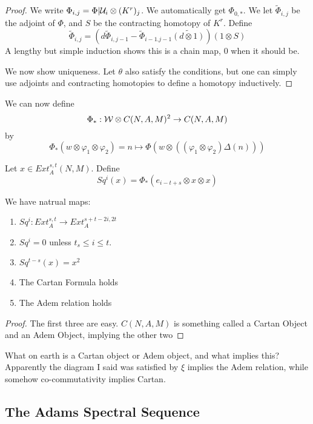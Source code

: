 \begin{proof}
  We write $\Phi_{i,j}=\Phi|\mathcal{U}_i\otimes (K^r)_j$.
  We automatically get $\Phi_{0,*}$.  
  We let $\tilde{\Phi}_{i,j}$ be the adjoint of $\Phi$, and $S$ be the contracting homotopy of $K^r$.  
  Define
  \[\tilde\Phi_{i,j}=(d\tilde\Phi_{i,j-1}-\tilde{\Phi}_{i-1.j-1}\widetilde{(d\otimes 1)})(1\otimes S)\]
  A lengthy but simple induction shows this is a chain map, 0 when it should be.  \cite[Page 98]{hrs}

  We now show uniqueness.  Let $\theta$ also satisfy the conditions, but one can simply use adjoints and contracting homotopies to define a homotopy inductively.  
\end{proof}

We can now define 
\[\Phi_* : \mathcal{W}\otimes C(N,A,M)^2\to C(N,A,M)\]
by
\[\Phi_*(w\otimes \varphi_1\otimes \varphi_2)=n\mapsto \Phi(w\otimes((\varphi_1\otimes\varphi_2)\Delta(n)))\]


\begin{Def}
  Let $x\in Ext^{s,t}_A(N,M)$.  Define
  \[Sq^i(x)=\Phi_*(e_{i-t+s}\otimes x\otimes x)\]
\end{Def}

\begin{Theorem}
  We have natrual maps:

  \begin{enumerate}
    \item $Sq^i :Ext_A^{s,t}\to Ext_A^{s+t-2i,2t}$ 
    \item $Sq^i=0$ unless $t_s\le i \le t$.  
    \item $Sq^{t-s}(x)=x^2$
    \item The Cartan Formula holds
    \item The Adem relation holds
  \end{enumerate}
\end{Theorem}

\begin{proof}
  The first three are easy.  $C(N,A,M)$ is something called a Cartan Object and an Adem Object, implying the other two
\end{proof}

\begin{Unknown}
  What on earth is a Cartan object or Adem object, and what implies this?
  Apparently the diagram I said was satisfied by $\xi$ implies the Adem relation, while somehow co-commutativity implies Cartan.  
\end{Unknown}

\subsection{The Adams Spectral Sequence}

